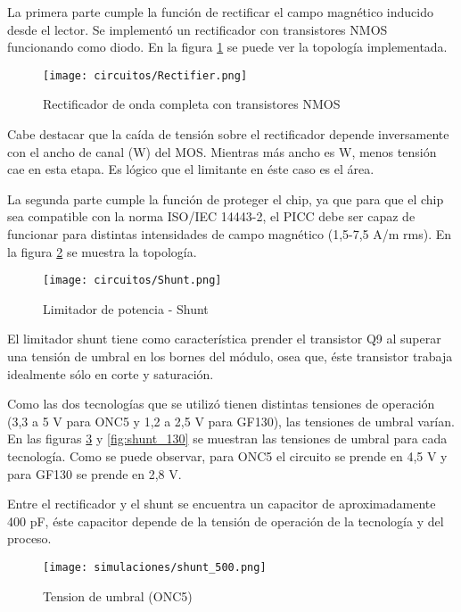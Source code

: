 La primera parte cumple la función de rectificar el campo magnético inducido desde el lector. Se implementó un rectificador con transistores NMOS funcionando como diodo. En la figura \ref{fig:rectifier} se puede ver la topología implementada. 

\begin{figure}[H]
\centering
\texttt{[image: circuitos/Rectifier.png]}
\caption{Rectificador de onda completa con transistores NMOS}
\label{fig:rectifier}
\end{figure}

Cabe destacar que la caída de tensión sobre el rectificador depende inversamente con el ancho de canal (W) del MOS. Mientras más ancho es W, menos tensión cae en esta etapa. Es lógico que el limitante en éste caso es el área. 

La segunda parte cumple la función de proteger el chip, ya que para que el chip sea compatible con la norma ISO/IEC 14443-2, el PICC debe ser capaz de funcionar para distintas intensidades de campo magnético (1,5-7,5 A/m rms). En la figura \ref{fig:shunt} se muestra la topología.

\begin{figure}[H]
\centering
\texttt{[image: circuitos/Shunt.png]}
\caption{Limitador de potencia - Shunt}
\label{fig:shunt}
\end{figure}

El limitador shunt tiene como característica prender el transistor Q9 al superar una tensión de umbral en los bornes del módulo, osea que, éste transistor trabaja idealmente sólo en corte y saturación. 

Como las dos tecnologías que se utilizó tienen distintas tensiones de operación (3,3 a 5 V para ONC5 y 1,2 a 2,5 V para GF130), las tensiones de umbral varían. En las figuras \ref{fig:shunt_500} y \ref{fig:shunt_130} se muestran las tensiones de umbral para cada tecnología. Como se puede observar, para ONC5 el circuito se prende en 4,5 V y para GF130 se prende en 2,8 V.

Entre el rectificador y el shunt se encuentra un capacitor de aproximadamente 400 pF, éste capacitor depende de la tensión de operación de la tecnología y del proceso. 

\begin{figure}[H]
\centering
\texttt{[image: simulaciones/shunt\_500.png]}
\caption{Tension de umbral (ONC5)}
\label{fig:shunt_500}
\end{figure}

